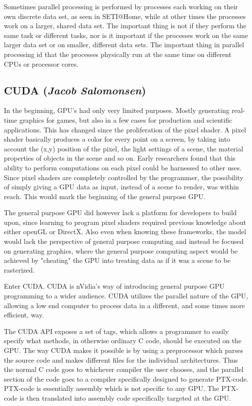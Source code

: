 Sometimes parallel processing is performed by processes each working on their own discrete data set, as seen in SETI@Home, while at other times the processes work on a larger, shared data set. The important thing is not if they perform the same task or different tasks, nor is it important if the processes work on the same larger data set or on smaller, different data sets. The important thing in parallel processing id that the processes physically run at the same time on different CPUs or processor cores.

\subsection{CUDA (\textit{Jacob Salomonsen})}
In the beginning, GPU's had only very limited purposes. Mostly generating real-time graphics for games, but also in a few cases for production and scientific applications. This has changed since the proliferation of the pixel shader. A pixel shader basically produces a color for every point on a screen, by taking into account the (x,y) position of the pixel, the light settings of a scene, the material properties of objects in the scene and so on. Early researchers found that this ability to perform computations on each pixel could be harnessed to other uses. Since pixel shaders are completely controlled by the programmer, the possibility of simply giving a GPU data as input, instead of a scene to render, was within reach. This would mark the beginning of the general purpose GPU.

The general purpose GPU did however lack a platform for developers to build upon, since learning to program pixel shaders required previous knowledge about either openGL or DirectX. Also even when knowing these frameworks, the model would lack the perspective of general purpose computing and instead be focused on generating graphics, where the general purpose computing aspect would be achieved by "cheating" the GPU into treating data as if it was a scene to be rasterized.

Enter CUDA. CUDA is nVidia's way of introducing general purpose GPU programming to a wider audience. CUDA utilizes the parallel nature of the GPU, allowing a low end computer to process data in a different, and some times more efficient, way.

The CUDA API exposes a set of tags, which allows a programmer to easily specify what methods, in otherwise ordinary C code, should be executed on the GPU. The way CUDA makes it possible is by using a preprocessor which parses the source code and makes different files for the individual architectures. Thus the normal C code goes to whichever compiler the user chooses, and the parallel section of the code goes to a compiler specifically designed to generate PTX-code. PTX-code is essentially assembly which is not specific to any GPU. The PTX-code is then translated into assembly code specifically targeted at the GPU.


